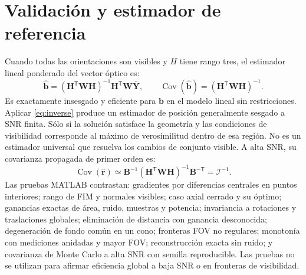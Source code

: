 \documentclass[11pt,a4paper]{article}
\begin{document}
\section{Validación y estimador de referencia}
Cuando todas las orientaciones son visibles y $H$ tiene rango tres, el estimador lineal ponderado del vector óptico es:
\begin{equation}
\hat{\mathbf b}=(\mathbf H^{\mathsf T}\mathbf W\mathbf H)^{-1}\mathbf H^{\mathsf T}\mathbf W\bar{\mathbf Y},\qquad
\operatorname{Cov}(\hat{\mathbf b})=(\mathbf H^{\mathsf T}\mathbf W\mathbf H)^{-1}.
\label{eq:GLS}
\end{equation}
Es exactamente insesgado y eficiente para $\mathbf b$ en el modelo lineal sin restricciones. Aplicar \eqref{eq:inverse} produce un estimador de posición generalmente sesgado a SNR finita. Sólo si la solución satisface la geometría y las condiciones de visibilidad corresponde al máximo de verosimilitud dentro de esa región. No es un estimador universal que resuelva los cambios de conjunto visible. A alta SNR, su covarianza propagada de primer orden es:
\begin{equation}
\operatorname{Cov}(\hat{\mathbf r})\simeq\mathbf B^{-1}(\mathbf H^{\mathsf T}\mathbf W\mathbf H)^{-1}\mathbf B^{-\mathsf T}=\mathcal I^{-1}.
\label{eq:delta}
\end{equation}
Las pruebas MATLAB contrastan: gradientes por diferencias centrales en puntos interiores; rango de FIM y normales visibles; caso axial cerrado y su óptimo; ganancias exactas de área, ruido, muestras y potencia; invariancia a rotaciones y traslaciones globales; eliminación de distancia con ganancia desconocida; degeneración de fondo común en un cono; fronteras FOV no regulares; monotonía con mediciones anidadas y mayor FOV; reconstrucción exacta sin ruido; y covarianza de Monte Carlo a alta SNR con semilla reproducible. Las pruebas no se utilizan para afirmar eficiencia global a baja SNR o en fronteras de visibilidad.



\end{document}
